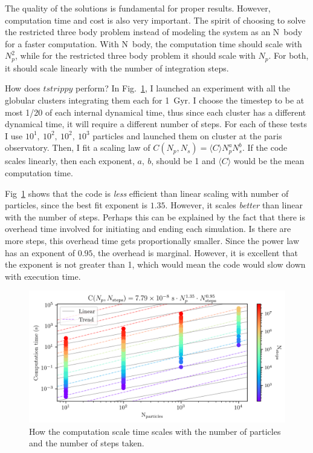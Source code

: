         The quality of the solutions is fundamental for proper results. However, computation time and cost is also very important. The spirit of choosing to solve the restricted three body problem instead of modeling the system as an N~body for a faster computation. With N~body, the computation time should scale with $N_p^2$, while for the restricted three body problem it should scale with $N_p$. For both, it should scale linearly with the number of integration steps. 

        How does $tstrippy$ perform? In Fig.~\ref{fig:NumericalErrorComputationTimeScalingForStreams}, I launched an experiment with all the globular clusters integrating them each for 1~Gyr. I choose the timestep to be at most 1/20 of each internal dynamical time, thus since each cluster has a different dynamical time, it will require a different number of steps. For each of these tests I use $10^1,~10^2,~10^2,~10^3$ particles and launched them on cluster at the paris observatory. Then, I fit a scaling law of $C(N_p,N_s) = \langle C\rangle N_p^a N_s^b$. If the code scales linearly, then each exponent, $a,~b$, should be 1 and $\langle C\rangle$ would be the mean computation time. 
        
        Fig~\ref{fig:NumericalErrorComputationTimeScalingForStreams} shows that the code is \textit{less} efficient than linear scaling with number of particles, since the best fit exponent is $1.35$. However, it scales \textit{better} than linear with the number of steps. Perhaps this can be explained by the fact that there is overhead time involved for initiating and ending each simulation. Is there are more steps, this overhead time gets proportionally smaller. Since the power law has an exponent of $0.95$, the overhead is marginal. However, it is excellent that the exponent is not greater than 1, which would mean the code would slow down with execution time. 


        \begin{figure}
            \centering
            \includegraphics[width=\linewidth]{images/NumericalErrorComputationTimeScalingForStreams.png}
            \caption{How the computation scale time scales with the number of particles and the number of steps taken.}
            \label{fig:NumericalErrorComputationTimeScalingForStreams}
        \end{figure}

